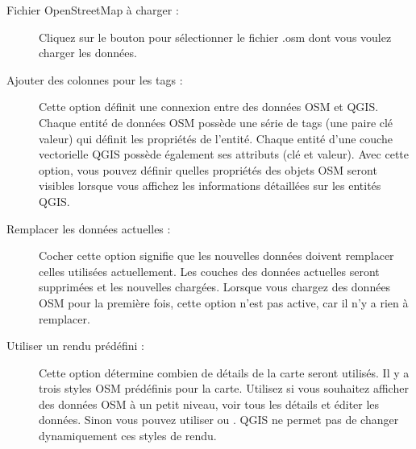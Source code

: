 \begin{description}
\item[Fichier OpenStreetMap à charger :] Cliquez sur le bouton pour sélectionner le fichier .osm dont vous voulez charger les données.
\item[Ajouter des colonnes pour les tags :] Cette option définit une connexion entre des données OSM et QGIS. Chaque entité de données OSM possède une série de tags (une paire clé valeur) qui définit les propriétés de l'entité. Chaque entité d'une couche vectorielle QGIS possède également ses attributs (clé et valeur). Avec cette option, vous pouvez définir quelles propriétés des objets OSM seront visibles lorsque vous affichez les informations détaillées sur les entités QGIS.
\item[Remplacer les données actuelles :] Cocher cette option signifie que les nouvelles données doivent remplacer celles utilisées actuellement. Les couches des données actuelles seront supprimées et les nouvelles chargées. Lorsque vous chargez des données OSM pour la première fois, cette option n'est pas active, car il n'y a rien à remplacer.
\item[Utiliser un rendu prédéfini :] Cette option détermine combien de détails de la carte seront utilisés. Il y a trois styles OSM prédéfinis pour la carte. Utilisez  si vous souhaitez afficher des données OSM à un petit niveau, voir tous les détails et éditer les données. Sinon vous pouvez utiliser  ou . QGIS \CURRENT ne permet pas de changer dynamiquement ces styles de rendu.
\end{description}


